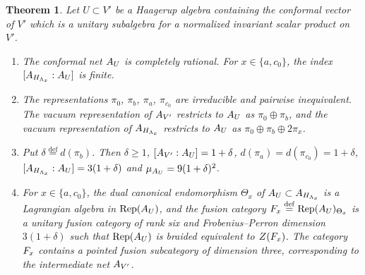 \documentclass[leqno]{article}
\let\cal\relax
\newcommand{\cal}{\mathcal}
\renewcommand{\geq}{\ensuremath{\geqslant}}
\newcommand{\ov}{\overset}
\DeclareMathOperator{\Rep}{Rep} %
\newtheorem{thm}{Theorem}[section]
\numberwithin{equation}{section}
\begin{document}
\begin{thm}
\label{thm:complete-rationality}
Let $U \subset V'$ be a Haagerup algebra containing the conformal vector of $V'$ which is a unitary subalgebra for a normalized invariant scalar product on $V'$.
\begin{enumerate}
\item The conformal net $\cal A_U$ is completely rational. For $x \in \{a,c_0\}$, the index $[\cal A_{H_{\Lambda_x}} : \cal A_U]$ is finite.
\item The representations $\pi_0$, $\pi_b$, $\pi_a$, $\pi_{c_0}$ are irreducible and pairwise inequivalent. The vacuum representation of $\cal A_{V'}$ restricts to $\cal A_U$ as $\pi_0 \oplus \pi_b$, and the vacuum representation of $\cal A_{H_{\Lambda_x}}$ restricts to $\cal A_U$ as $\pi_0 \oplus \pi_b \oplus 2\pi_x$.
\item Put $\delta \ov{\mathrm{def}}{=} d(\pi_b)$. Then $\delta \geq 1$, $[\cal A_{V'} : \cal A_U] = 1+\delta$, $d(\pi_a) = d(\pi_{c_0}) = 1+\delta$, $[\cal A_{H_{\Lambda_x}} : \cal A_U] = 3(1+\delta)$ and $\mu_{\cal A_U} = 9(1+\delta)^2$.
\item For $x \in \{a,c_0\}$, the dual canonical endomorphism $\Theta_x$ of $\cal A_U \subset \cal A_{H_{\Lambda_x}}$ is a Lagrangian algebra in $\Rep(\cal A_U)$, and the fusion category $\cal F_x \ov{\mathrm{def}}{=} \Rep(\cal A_U)_{\Theta_x}$ is a unitary fusion category of rank six and Frobenius--Perron dimension $3(1+\delta)$ such that $\Rep(\cal A_U)$ is braided equivalent to $Z(\cal F_x)$. The category $\cal F_x$ contains a pointed fusion subcategory of dimension three, corresponding to the intermediate net $\cal A_{V'}$.
\end{enumerate}
\end{thm}
\end{document}
